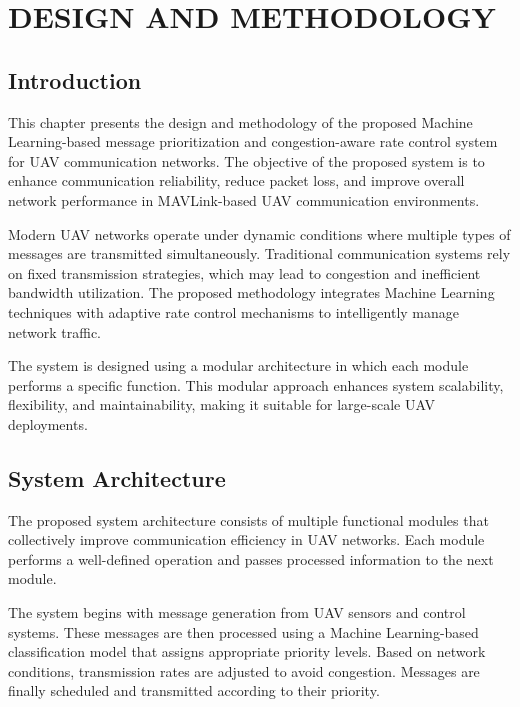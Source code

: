 \chapter{DESIGN AND METHODOLOGY}

\section{Introduction}

This chapter presents the design and methodology of the proposed 
Machine Learning-based message prioritization and congestion-aware 
rate control system for UAV communication networks. The objective of 
the proposed system is to enhance communication reliability, reduce 
packet loss, and improve overall network performance in MAVLink-based 
UAV communication environments.

Modern UAV networks operate under dynamic conditions where multiple 
types of messages are transmitted simultaneously. Traditional 
communication systems rely on fixed transmission strategies, which 
may lead to congestion and inefficient bandwidth utilization. The 
proposed methodology integrates Machine Learning techniques with 
adaptive rate control mechanisms to intelligently manage network 
traffic.

The system is designed using a modular architecture in which each 
module performs a specific function. This modular approach enhances 
system scalability, flexibility, and maintainability, making it 
suitable for large-scale UAV deployments.


\section{System Architecture}

The proposed system architecture consists of multiple functional 
modules that collectively improve communication efficiency in UAV 
networks. Each module performs a well-defined operation and passes 
processed information to the next module.

The system begins with message generation from UAV sensors and 
control systems. These messages are then processed using a Machine 
Learning-based classification model that assigns appropriate priority 
levels. Based on network conditions, transmission rates are adjusted 
to avoid congestion. Messages are finally scheduled and transmitted 
according to their priority.

